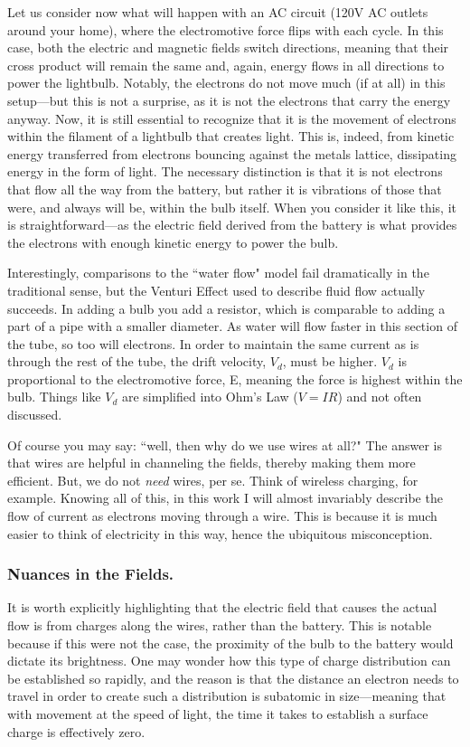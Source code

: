 \documentclass[12pt]{report}
\begin{document}
Let us consider now what will happen with an AC circuit (120V AC outlets around your home), where the electromotive force flips with each cycle. In this case, both the electric and magnetic fields switch directions, meaning that their cross product will remain the same and, again, energy flows in all directions to power the lightbulb. Notably, the electrons do not move much (if at all) in this setup---but this is not a surprise, as it is not the electrons that carry the energy anyway. Now, it is still essential to recognize that it is the movement of electrons within the filament of a lightbulb that creates light. This is, indeed, from kinetic energy transferred from electrons bouncing against the metals lattice, dissipating energy in the form of light. The necessary distinction is that it is not electrons that flow all the way from the battery, but rather it is vibrations of those that were, and always will be, within the bulb itself. When you consider it like this, it is straightforward---as the electric field derived from the battery is what provides the electrons with enough kinetic energy to power the bulb.\newline

Interestingly, comparisons to the ``water flow" model fail dramatically in the traditional sense, but the Venturi Effect used to describe fluid flow actually succeeds. In adding a bulb you add a resistor, which is comparable to adding a part of a pipe with a smaller diameter. As water will flow faster in this section of the tube, so too will electrons. In order to maintain the same current as is through the rest of the tube, the drift velocity, $V_d$, must be higher. $V_d$ is proportional to the electromotive force, E, meaning the force is highest within the bulb. Things like $V_d$ are simplified into Ohm's Law ($V = IR$) and not often discussed.\newline 

Of course you may say: ``well, then why do we use wires at all?" The answer is that wires are helpful in channeling the fields, thereby making them more efficient. But, we do not \textit{need} wires, per se. Think of wireless charging, for example. Knowing all of this, in this work I will almost invariably describe the flow of current as electrons moving through a wire. This is because it is much easier to think of electricity in this way, hence the ubiquitous misconception. 

\subsubsection{Nuances in the Fields.} It is worth explicitly highlighting that the electric field that causes the actual flow is from charges along the wires, rather than the battery. This is notable because if this were not the case, the proximity of the bulb to the battery would dictate its brightness. One may wonder how this type of charge distribution can be established so rapidly, and the reason is that the distance an electron needs to travel in order to create such a distribution is subatomic in size---meaning that with movement at the speed of light, the time it takes to establish a surface charge is effectively zero.\newline
\end{document}
